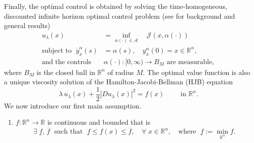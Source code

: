 \documentclass[12pt]{amsart}
\numberwithin{equation}{section}
\theoremstyle{plain}
\begin{document}
Finally,  the optimal control is obtained by solving the time-homogeneous, discounted infinite horizon optimal control problem (see \cite{carlson2012infinite} for background and general results)
\begin{equation}\label{OCP}
\begin{aligned}
     u_{\lambda}(x) & = 
    \inf\limits_{\alpha(\cdot)\in \mathcal{A}} 
    \quad \mathscr{J}(x,\alpha(\cdot))\\
     \text{subject  to  }\; \dot{y}_{x}^{\alpha}(s) & = \alpha(s),\quad y_{x}^{\alpha}(0)=x\in\mathbb{R}^n,\\
     \text{and the controls } &\alpha(\cdot):[0,\infty) \to B_{M} \text{ are measurable},
\end{aligned}
\end{equation}
where $B_{M}$ is the closed ball in $\mathbb{R}^{n}$ of radius $M$. 
The optimal value function is also a unique viscosity solution \cite{bardi1997optimal} of the Hamilton-Jacobi-Bellman (HJB) equation 
\begin{equation}\label{eq: HJB}
    \lambda\, u_{\lambda}(x) + \frac{1}{2}|Du_{\lambda}(x)|^{2} = f(x) \quad \quad \text{ in } \mathbb{R}^{n}.
\end{equation}
We now introduce our first main assumption.


\begin{enumerate}[label=\textbf{(A\arabic*)}]
\item\label{f: nice} $f : \mathbb{R}^n\to\mathbb{R}$ is  continuous and bounded that is
    \begin{equation*}
    \exists\;\underline{f},\,\overline{f}\; \text{ such that }\; \underline{f} \leq f(x) \leq \overline{f},\quad \forall\;x\in \mathbb{R}^n, \quad \text{where } \; \underline{f}:= \min\limits_{\mathbb{R}^{n}}f.
    \end{equation*}
\end{enumerate}
\end{document}
